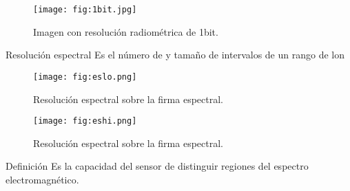 
\begin{frame}{}
  \begin{figure}
    \centering
    \texttt{[image: fig:1bit.jpg]}
    \caption{Imagen con resolución radiométrica de 1bit.}
    \label{}
  \end{figure}
\end{frame}



\begin{frame}{}
    \begin{block}{Resolución espectral}
        Es el número de y tamaño de intervalos de un rango de lon
    \end{block}
\end{frame}

\begin{frame}{}
  \begin{figure}
    \centering
    \texttt{[image: fig:eslo.png]}
    \caption{Resolución espectral sobre la firma espectral.}
    \label{}
  \end{figure}
\end{frame}

\begin{frame}{}
  \begin{figure}
    \centering
    \texttt{[image: fig:eshi.png]}
    \caption{Resolución espectral sobre la firma espectral.}
    \label{}
  \end{figure}
\end{frame}

\begin{frame}{}
    \begin{block}{Definición}
        Es la capacidad del sensor de distinguir regiones del espectro electromagnético.
    \end{block}
\end{frame}



